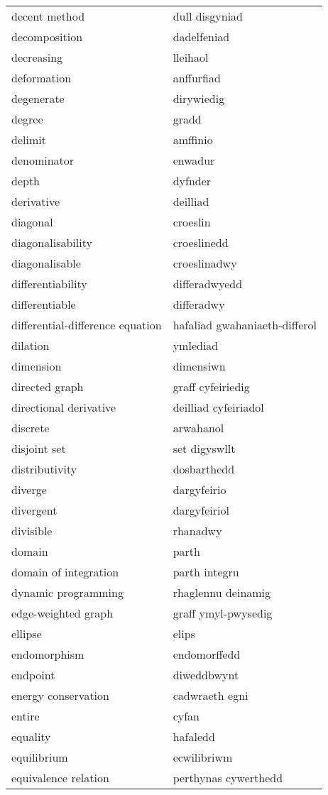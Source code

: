 \begin{supertabular}{p{0.22\textwidth}p{0.22\textwidth}}
decent method & dull disgyniad \\
decomposition & dadelfeniad \\
decreasing & lleihaol \\
deformation & anffurfiad \\
degenerate & dirywiedig \\
degree & gradd \\
delimit & amffinio \\
denominator & enwadur \\
depth & dyfnder \\
derivative & deilliad \\
diagonal & croeslin \\
diagonalisability & croeslinedd \\
diagonalisable & croeslinadwy \\
differentiability & differadwyedd \\
differentiable & differadwy \\
differential-difference equation & hafaliad gwahaniaeth-differol \\
dilation & ymlediad \\
dimension & dimensiwn \\
directed graph & graff cyfeiriedig \\
directional derivative & deilliad cyfeiriadol \\
discrete & arwahanol \\
disjoint set & set digyswllt \\
distributivity & dosbarthedd \\
diverge & dargyfeirio \\
divergent & dargyfeiriol \\
divisible & rhanadwy \\
domain & parth \\
domain of integration & parth integru \\
dynamic programming & rhaglennu deinamig \\
edge-weighted graph & graff ymyl-pwysedig \\
ellipse & elips \\
endomorphism & endomorffedd \\
endpoint & diweddbwynt \\
energy conservation & cadwraeth egni \\
entire & cyfan \\
equality & hafaledd \\
equilibrium & ecwilibriwm \\
equivalence relation & perthynas cywerthedd \\

\end{supertabular}
